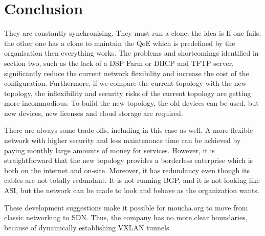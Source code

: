 \documentclass{article}
\begin{document}
\section{Conclusion}
They are constantly synchronising. They must run a clone. the idea is If one fails, the other one has a clone to maintain the QoE which is predefined by the organisation then everything works. The problems and shortcomings identified in section two, such as the lack of a DSP Farm or DHCP and TFTP server, significantly reduce the current network flexibility and increase the cost of the configuration. Furthermore, if we compare the current topology with the new topology, the inflexibility and security risks of the current topology are getting more incommodious. To build the new topology, the old devices can be used, but new devices, new licenses and cloud storage are required.

There are always some trade-offs, including in this case as well. A more flexible network with higher security and less maintenance time can be achieved by paying monthly large amounts of money for services. However, it is straightforward that the new topology provides a borderless enterprise which is both on the internet and on-site. Moreover, it has redundancy even though its cables are not totally redundant. It is not running BGP, and it is not looking like ASI, but the network can be made to look and behave as the organization wants.

These development suggestions make it possible for moucha.org to move from classic networking to SDN. Thus, the company has no more clear boundaries, because of dynamically establishing VXLAN tunnels.

\printbibliography

\clearpage
\glsaddall
\printglossaries
\end{document}
